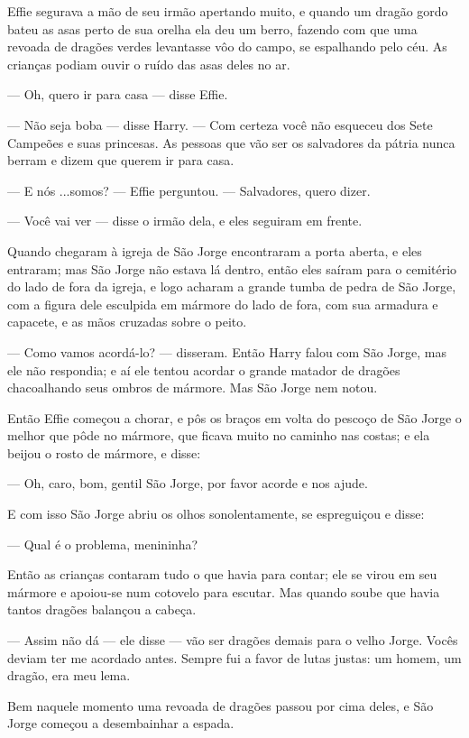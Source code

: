 Effie segurava a mão de seu irmão apertando muito, e quando um dragão
gordo bateu as asas perto de sua orelha ela deu um berro, fazendo com
que uma revoada de dragões verdes levantasse vôo do campo, se
espalhando pelo céu. As crianças podiam ouvir o ruído das asas deles
no ar.

— Oh, quero ir para casa — disse Effie.

— Não seja boba — disse Harry. — Com certeza você não esqueceu dos
Sete Campeões e suas princesas. As pessoas que vão ser os salvadores
da pátria nunca berram e dizem que querem ir para casa. 

— E nós ...somos? — Effie perguntou. — Salvadores, quero dizer.

— Você vai ver — disse o irmão dela, e eles seguiram em frente.

Quando chegaram à igreja de São Jorge encontraram a porta aberta, e
eles entraram; mas São Jorge não estava lá dentro, então eles saíram
para o cemitério do lado de fora da igreja, e logo acharam a grande
tumba de pedra de São Jorge, com a figura dele esculpida em mármore
do lado de fora, com sua armadura e capacete, e as mãos cruzadas
sobre o peito.

— Como vamos acordá-lo? — disseram. Então Harry falou com São Jorge,
mas ele não respondia; e aí ele tentou acordar o grande matador de
dragões chacoalhando seus ombros de mármore. Mas São Jorge nem notou.

Então Effie começou a chorar, e pôs os braços em volta do pescoço de
São Jorge o melhor que pôde no mármore, que ficava muito no caminho
nas costas; e ela beijou o rosto de mármore, e disse:

— Oh, caro, bom, gentil São Jorge, por favor acorde e nos ajude.

E com isso São Jorge abriu os olhos sonolentamente, se espreguiçou e
disse:

— Qual é o problema, menininha?

Então as crianças contaram tudo o que havia para contar; ele se virou
em seu mármore e apoiou-se num cotovelo para escutar. Mas quando
soube que havia tantos dragões balançou a cabeça.

— Assim não dá — ele disse — vão ser dragões demais para o velho
Jorge. Vocês deviam ter me acordado antes. Sempre fui a favor de
lutas justas: um homem, um dragão, era meu lema.

Bem naquele momento uma revoada de dragões passou por cima deles, e
São Jorge começou a desembainhar a espada.

